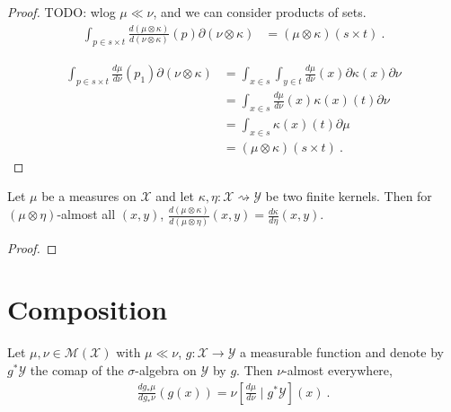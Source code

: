 \begin{proof} \leanok
{}
TODO: wlog $\mu \ll \nu$, and we can consider products of sets.
\begin{align*}
\int_{p \in s \times t} \frac{d (\mu \otimes \kappa)}{d (\nu \otimes \kappa)}(p) \partial(\nu \otimes \kappa)
&= (\mu \otimes \kappa) (s \times t)
\: .
\end{align*}

\begin{align*}
\int_{p \in s \times t} \frac{d \mu}{d \nu}(p_1) \partial(\nu \otimes \kappa)
&= \int_{x \in s} \int_{y \in t} \frac{d \mu}{d \nu}(x) \partial \kappa(x) \partial \nu
\\
&= \int_{x \in s} \frac{d \mu}{d \nu}(x) \kappa(x)(t) \partial \nu
\\
&= \int_{x \in s} \kappa(x)(t) \partial \mu
\\
&= (\mu \otimes \kappa) (s \times t)
\: .
\end{align*}


\end{proof}

\begin{corollary}
  \label{cor:rnDeriv_compProd_right}
  \leanok
  Let $\mu$ be a measures on $\mathcal X$ and let $\kappa, \eta : \mathcal X \rightsquigarrow \mathcal Y$ be two finite kernels. Then for $(\mu \otimes \eta)$-almost all $(x, y)$, $\frac{d (\mu \otimes \kappa)}{d (\mu \otimes \eta)}(x,y) = \frac{d \kappa}{d \eta}(x,y)$.
\end{corollary}

\begin{proof} \leanok
{}
\end{proof}



\section{Composition}


\begin{lemma}
  \label{lem:rnDeriv_map_eq_condexp}
  \leanok
  \uses{}
  Let $\mu, \nu \in \mathcal M(\mathcal X)$ with $\mu \ll \nu$, $g : \mathcal X \to \mathcal Y$ a measurable function and denote by $g^* \mathcal Y$ the comap of the $\sigma$-algebra on $\mathcal Y$ by $g$.
  Then $\nu$-almost everywhere,
  \begin{align*}
  \frac{d g_*\mu}{d g_*\nu}(g(x)) = \nu\left[ \frac{d \mu}{d \nu} \mid g^* \mathcal Y\right](x)
  \: .
  \end{align*}
\end{lemma}

